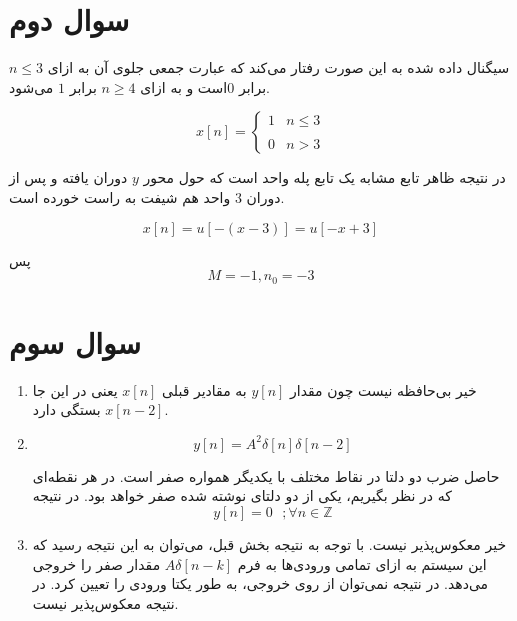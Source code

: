 \documentclass[12pt]{article}
\begin{document}
\newpage

\section{سوال دوم}

سیگنال داده شده به این صورت رفتار می‌کند که عبارت جمعی جلوی آن به ازای $n\leq 3$ برابر $0$‌است و به ازای $n\geq 4$ برابر $1$‌ می‌شود.

\[ x[n] = \begin{cases} 
	1 & n \leq 3 \\
	 \\
	0 & n > 3 
\end{cases}
\]

در نتیجه ظاهر تابع مشابه یک تابع پله واحد است که حول محور $y$ دوران یافته و پس از دوران $3$ واحد هم شیفت به راست خورده است.

$$x[n] = u[- (x-3)]= u[-x +3]$$

پس
$$M = -1 , n_0 = -3$$

\begin{center}
\end{center}

\newpage

\section{سوال سوم}

\begin{enumerate}[label = \Alph*)]
	
	\item
	خیر بی‌حافظه نیست چون مقدار $y[n]$ به مقادیر قبلی $x[n]$ یعنی در این جا $x[n-2]$ بستگی دارد.
	
	\item
	
	$$y[n] = A^2 \delta[n]\delta[n-2]$$
	
	حاصل ضرب دو دلتا در نقاط مختلف با یکدیگر همواره صفر است. در هر نقطه‌ای که در نظر بگیریم، یکی از دو دلتای نوشته شده صفر خواهد بود. در نتیجه
	$$y[n] = 0~~~; \forall n \in \mathbb{Z}$$
	
	\item
	خیر معکوس‌پذیر نیست. با توجه به نتیجه بخش قبل، می‌توان به این نتیجه رسید که این سیستم به ازای تمامی ورودی‌ها به فرم  $A \delta[n-k]$ مقدار صفر را خروجی ‌می‌دهد. در نتیجه نمی‌توان از روی خروجی، به طور یکتا ورودی را تعیین کرد. در نتیجه معکوس‌پذیر نیست.
\end{enumerate}
\end{document}
